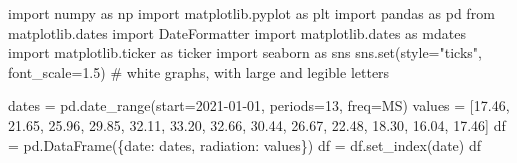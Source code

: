 \documentclass[
  letterpaper,
  DIV=11,
  numbers=noendperiod,
  oneside]{scrreprt}
\newenvironment{Shaded}{\begin{snugshade}}{\end{snugshade}}
\newcommand{\BuiltInTok}[1]{\textcolor[rgb]{0.00,0.23,0.31}{#1}}
\newcommand{\CommentTok}[1]{\textcolor[rgb]{0.37,0.37,0.37}{#1}}
\newcommand{\DecValTok}[1]{\textcolor[rgb]{0.68,0.00,0.00}{#1}}
\newcommand{\FloatTok}[1]{\textcolor[rgb]{0.68,0.00,0.00}{#1}}
\newcommand{\ImportTok}[1]{\textcolor[rgb]{0.00,0.46,0.62}{#1}}
\newcommand{\NormalTok}[1]{\textcolor[rgb]{0.00,0.23,0.31}{#1}}
\newcommand{\OperatorTok}[1]{\textcolor[rgb]{0.37,0.37,0.37}{#1}}
\newcommand{\StringTok}[1]{\textcolor[rgb]{0.13,0.47,0.30}{#1}}
\begin{document}
\begin{Shaded}
\begin{Highlighting}[]
\ImportTok{import}\NormalTok{ numpy }\ImportTok{as}\NormalTok{ np}
\ImportTok{import}\NormalTok{ matplotlib.pyplot }\ImportTok{as}\NormalTok{ plt}
\ImportTok{import}\NormalTok{ pandas }\ImportTok{as}\NormalTok{ pd}
\ImportTok{from}\NormalTok{ matplotlib.dates }\ImportTok{import}\NormalTok{ DateFormatter}
\ImportTok{import}\NormalTok{ matplotlib.dates }\ImportTok{as}\NormalTok{ mdates}
\ImportTok{import}\NormalTok{ matplotlib.ticker }\ImportTok{as}\NormalTok{ ticker}
\ImportTok{import}\NormalTok{ seaborn }\ImportTok{as}\NormalTok{ sns}
\NormalTok{sns.}\BuiltInTok{set}\NormalTok{(style}\OperatorTok{=}\StringTok{"ticks"}\NormalTok{, font\_scale}\OperatorTok{=}\FloatTok{1.5}\NormalTok{)  }\CommentTok{\# white graphs, with large and legible letters}
\end{Highlighting}
\end{Shaded}

\begin{Shaded}
\begin{Highlighting}[]
\NormalTok{dates }\OperatorTok{=}\NormalTok{ pd.date\_range(start}\OperatorTok{=}\StringTok{\textquotesingle{}2021{-}01{-}01\textquotesingle{}}\NormalTok{, periods}\OperatorTok{=}\DecValTok{13}\NormalTok{, freq}\OperatorTok{=}\StringTok{\textquotesingle{}MS\textquotesingle{}}\NormalTok{)}
\NormalTok{values }\OperatorTok{=}\NormalTok{ [}\FloatTok{17.46}\NormalTok{, }\FloatTok{21.65}\NormalTok{, }\FloatTok{25.96}\NormalTok{, }\FloatTok{29.85}\NormalTok{, }\FloatTok{32.11}\NormalTok{, }\FloatTok{33.20}\NormalTok{, }\FloatTok{32.66}\NormalTok{, }\FloatTok{30.44}\NormalTok{, }\FloatTok{26.67}\NormalTok{, }\FloatTok{22.48}\NormalTok{, }\FloatTok{18.30}\NormalTok{, }\FloatTok{16.04}\NormalTok{, }\FloatTok{17.46}\NormalTok{]}
\NormalTok{df }\OperatorTok{=}\NormalTok{ pd.DataFrame(\{}\StringTok{\textquotesingle{}date\textquotesingle{}}\NormalTok{: dates, }\StringTok{\textquotesingle{}radiation\textquotesingle{}}\NormalTok{: values\})}
\NormalTok{df }\OperatorTok{=}\NormalTok{ df.set\_index(}\StringTok{\textquotesingle{}date\textquotesingle{}}\NormalTok{)}
\NormalTok{df}
\end{Highlighting}
\end{Shaded}
\end{document}
